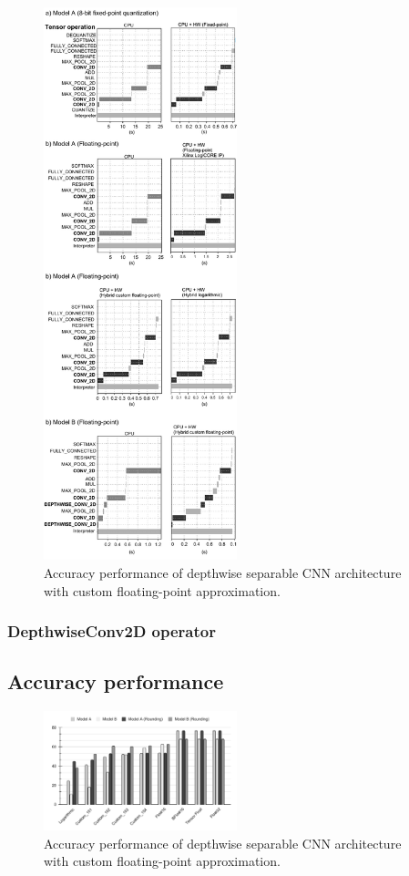 \begin{figure}[t!]
	\centering
	\includegraphics[width=0.5\textwidth]{../figures/inference_schedule.pdf}
	\caption{Accuracy performance of depthwise separable CNN architecture with custom floating-point approximation.}
	\label{fig:fixed_point}
\end{figure}
\subsubsection{DepthwiseConv2D operator}
\subsection{Accuracy performance}


\begin{figure}[t!]
	\centering
	\includegraphics[width=0.5\textwidth]{../figures/all_models_accuracy.pdf}
	\caption{Accuracy performance of depthwise separable CNN architecture with custom floating-point approximation.}
	\label{fig:acc_custom}
\end{figure}

